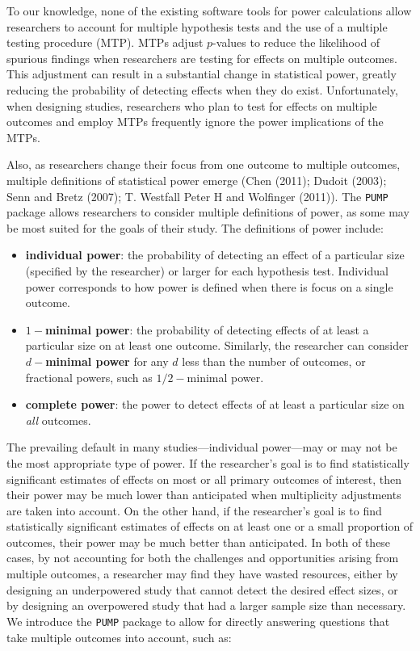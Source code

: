 \documentclass[
]{article}
\providecommand{\tightlist}{%
  \setlength{\itemsep}{0pt}\setlength{\parskip}{0pt}}
\begin{document}
To our knowledge, none of the existing software tools for power
calculations allow researchers to account for multiple hypothesis tests
and the use of a multiple testing procedure (MTP). MTPs adjust
\(p\)-values to reduce the likelihood of spurious findings when
researchers are testing for effects on multiple outcomes. This
adjustment can result in a substantial change in statistical power,
greatly reducing the probability of detecting effects when they do
exist. Unfortunately, when designing studies, researchers who plan to
test for effects on multiple outcomes and employ MTPs frequently ignore
the power implications of the MTPs.

Also, as researchers change their focus from one outcome to multiple
outcomes, multiple definitions of statistical power emerge (Chen (2011);
Dudoit (2003); Senn and Bretz (2007); T. Westfall Peter H and Wolfinger
(2011)). The \texttt{PUMP} package allows researchers to consider
multiple definitions of power, as some may be most suited for the goals
of their study. The definitions of power include:

\begin{itemize}
\tightlist
\item
  \textbf{individual power}: the probability of detecting an effect of a
  particular size (specified by the researcher) or larger for each
  hypothesis test. Individual power corresponds to how power is defined
  when there is focus on a single outcome.
\item
  \textbf{\(1-\)minimal power}: the probability of detecting effects of
  at least a particular size on at least one outcome. Similarly, the
  researcher can consider \textbf{\(d-\)minimal power} for any \(d\)
  less than the number of outcomes, or fractional powers, such as
  \(1/2-\)minimal power.
\item
  \textbf{complete power}: the power to detect effects of at least a
  particular size on \emph{all} outcomes.
\end{itemize}

The prevailing default in many studies---individual power---may or may
not be the most appropriate type of power. If the researcher's goal is
to find statistically significant estimates of effects on most or all
primary outcomes of interest, then their power may be much lower than
anticipated when multiplicity adjustments are taken into account. On the
other hand, if the researcher's goal is to find statistically
significant estimates of effects on at least one or a small proportion
of outcomes, their power may be much better than anticipated. In both of
these cases, by not accounting for both the challenges and opportunities
arising from multiple outcomes, a researcher may find they have wasted
resources, either by designing an underpowered study that cannot detect
the desired effect sizes, or by designing an overpowered study that had
a larger sample size than necessary. We introduce the \texttt{PUMP}
package to allow for directly answering questions that take multiple
outcomes into account, such as:
\end{document}
